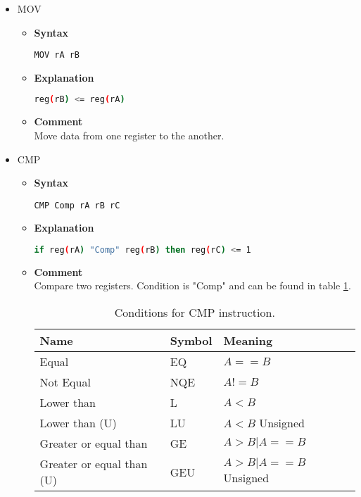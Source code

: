 \begin{itemize}
    \item MOV
    \begin{itemize}
        \item \textbf{Syntax}
        \begin{lstlisting}[language={[x86masm]Assembler}, frame=single]
    MOV rA rB
        \end{lstlisting}
        \item \textbf{Explanation}
        \begin{lstlisting}[language=bash, frame=single]
    reg(rB) <= reg(rA)
        \end{lstlisting}
        \item \textbf{Comment} \\
    Move data from one register to the another.
    \end{itemize}

    \item CMP
    \begin{itemize}
        \item \textbf{Syntax}
        \begin{lstlisting}[language={[x86masm]Assembler}, frame=single]
    CMP Comp rA rB rC
        \end{lstlisting}
        \item \textbf{Explanation}
        \begin{lstlisting}[language=bash, frame=single]
    if reg(rA) "Comp" reg(rB) then reg(rC) <= 1
        \end{lstlisting}
        \item \textbf{Comment} \\
    Compare two registers. Condition is "Comp" and can be found in table \ref{tab:cmp_conds}.

    \begin{table}[h]
        \centering
        \begin{tabular}{|l|l|l|}
            \hline
            \textbf{Name}             & \textbf{Symbol} & \textbf{Meaning}      \\ \hline
            Equal                     & EQ              & $A==B$                \\ \hline
            Not Equal                 & NQE             & $A!=B$                \\ \hline
            Lower than                & L               & $A<B$                 \\ \hline
            Lower than (U)            & LU              & $A<B$ Unsigned        \\ \hline
            Greater or equal than     & GE              & $A>B | A==B$          \\ \hline
            Greater or equal than (U) & GEU             & $A>B | A==B$ Unsigned \\ \hline
        \end{tabular}
        \caption{Conditions for CMP instruction.}
        \label{tab:cmp_conds}
    \end{table}


\end{itemize}
\end{itemize}
